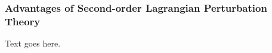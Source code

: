 \subsubsection{Advantages of Second-order Lagrangian Perturbation Theory}
\label{subsubsec:computational_theory--perturbation_theory--2lpt}


Text goes here.




